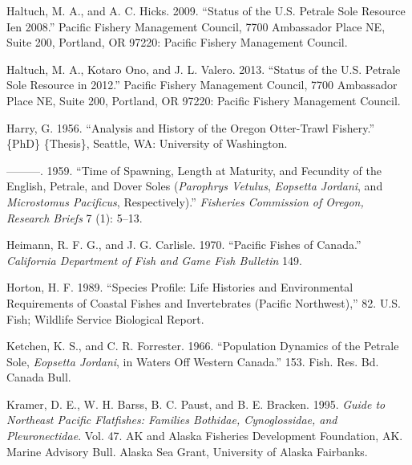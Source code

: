 \documentclass[11pt,
  english,
  letterpaper,
]{article}
\newlength{\cslhangindent}
\newenvironment{CSLReferences}[2] %
 {%
  \setlength{\parindent}{0pt}
  \ifodd #1 \everypar{\setlength{\hangindent}{\cslhangindent}}\ignorespaces\fi
  \ifnum #2 > 0
  \setlength{\parskip}{#2\baselineskip}
  \fi
 }%
 {}
\begin{document}
\begin{CSLReferences}{1}{0}
\leavevmode{}%
Haltuch, M. A., and A. C. Hicks. 2009. {``Status of the {U}.{S}. Petrale Sole Resource Ien 2008.''} Pacific Fishery Management Council, 7700 Ambassador Place NE, Suite 200, Portland, OR 97220: Pacific Fishery Management Council.

\leavevmode{}%
Haltuch, M. A., Kotaro Ono, and J. L. Valero. 2013. {``Status of the {U}.{S}. Petrale Sole Resource in 2012.''} Pacific Fishery Management Council, 7700 Ambassador Place NE, Suite 200, Portland, OR 97220: Pacific Fishery Management Council.

\leavevmode{}%
Harry, G. 1956. {``Analysis and History of the {Oregon} Otter-Trawl Fishery.''} \{PhD\} \{Thesis\}, Seattle, WA: University of Washington.

\leavevmode{}%
---------. 1959. {``Time of Spawning, Length at Maturity, and Fecundity of the {English}, Petrale, and Dover Soles (\emph{{Parophrys} Vetulus}, \emph{{Eopsetta} Jordani}, and \emph{{Microstomus} Pacificus}, Respectively).''} \emph{Fisheries Commission of Oregon, Research Briefs} 7 (1): 5--13.

\leavevmode{}%
Heimann, R. F. G., and J. G. Carlisle. 1970. {``Pacific {Fishes} of {Canada}.''} \emph{California Department of Fish and Game Fish Bulletin} 149.

\leavevmode{}%
Horton, H. F. 1989. {``Species Profile: Life Histories and Environmental Requirements of Coastal Fishes and Invertebrates ({Pacific} {Northwest}),''} 82. U.S. Fish; Wildlife Service Biological Report.

\leavevmode{}%
Ketchen, K. S., and C. R. Forrester. 1966. {``Population Dynamics of the Petrale Sole, \emph{{Eopsetta} Jordani}, in Waters Off Western {Canada}.''} 153. Fish. Res. Bd. Canada Bull.

\leavevmode{}%
Kramer, D. E., W. H. Barss, B. C. Paust, and B. E. Bracken. 1995. \emph{Guide to Northeast {Pacific} Flatfishes: Families {Bothidae}, {Cynoglossidae}, and {Pleuronectidae}}. Vol. 47. {AK} and {Alaska} {Fisheries} {Development} {Foundation}, {AK}. {Marine} {Advisory} {Bull}. Alaska Sea Grant, University of Alaska Fairbanks.


\end{CSLReferences}
\end{document}
